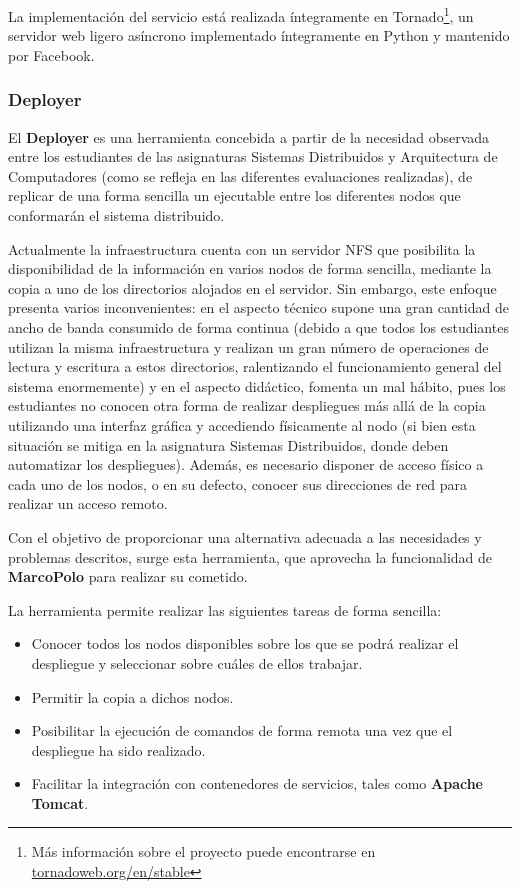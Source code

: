 La implementación del servicio está realizada íntegramente en Tornado\footnote{Más información sobre el proyecto puede encontrarse en \href{http://www.tornadoweb.org/en/stable/}{tornadoweb.org/en/stable}}, un servidor web ligero asíncrono implementado íntegramente en Python y mantenido por Facebook.

\subsubsection{Deployer}

El \textbf{Deployer} es una herramienta concebida a partir de la necesidad observada entre los estudiantes de las asignaturas Sistemas Distribuidos y Arquitectura de Computadores (como se refleja en las diferentes evaluaciones\citationneeded %
realizadas), de replicar de una forma sencilla un ejecutable entre los diferentes nodos que conformarán el sistema distribuido.

Actualmente la infraestructura cuenta con un servidor NFS que posibilita la disponibilidad de la información en varios nodos de forma sencilla, mediante la copia a uno de los directorios alojados en el servidor. Sin embargo, este enfoque presenta varios inconvenientes: en el aspecto técnico supone una gran cantidad de ancho de banda consumido de forma continua (debido a que todos los estudiantes utilizan la misma infraestructura y realizan un gran número de operaciones de lectura y escritura a estos directorios, ralentizando el funcionamiento general del sistema enormemente) y en el aspecto didáctico, fomenta un mal hábito, pues los estudiantes no conocen otra forma de realizar despliegues más allá de la copia utilizando una interfaz gráfica y accediendo físicamente al nodo (si bien esta situación se mitiga en la asignatura Sistemas Distribuidos, donde deben automatizar los despliegues). Además, es necesario disponer de acceso físico a cada uno de los nodos, o en su defecto, conocer sus direcciones de red para realizar un acceso remoto.

Con el objetivo de proporcionar una alternativa adecuada a las necesidades y problemas descritos, surge esta herramienta, que aprovecha la funcionalidad de \textbf{MarcoPolo} para realizar su cometido.

La herramienta permite realizar las siguientes tareas de forma sencilla:

\begin{itemize}
\item Conocer todos los nodos disponibles sobre los que se podrá realizar el despliegue y seleccionar sobre cuáles de ellos trabajar.
\item Permitir la copia a dichos nodos.
\item Posibilitar la ejecución de comandos de forma remota una vez que el despliegue ha sido realizado.
\item Facilitar la integración con contenedores de servicios, tales como \textbf{Apache Tomcat}.
\end{itemize}

